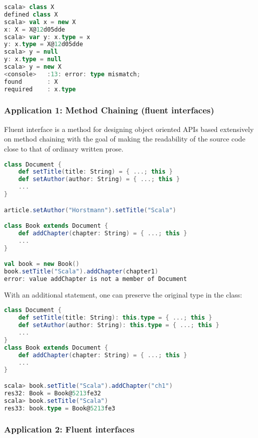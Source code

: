 \begin{lstlisting}[language=scala,mathescape=false]
scala> class X
defined class X
scala> val x = new X
x: X = X@12d05dde
scala> var y: x.type = x
y: x.type = X@12d05dde
scala> y = null
y: x.type = null
scala> y = new X
<console>   :13: error: type mismatch;
found       : X
required    : x.type
\end{lstlisting}

\clearpage
\hypertarget{application-1-method-chaining-fluent-interfaces}{%
\subsubsection{Application 1: Method Chaining (fluent
interfaces)}\label{application-1-method-chaining-fluent-interfaces}}

Fluent interface is a method for designing object oriented APIs based
extensively on method chaining with the goal of making the readability
of the source code close to that of ordinary written prose.

\begin{lstlisting}[language=scala,mathescape=false]
class Document {
    def setTitle(title: String) = { ...; this }
    def setAuthor(author: String) = { ...; this }
    ...
}

article.setAuthor("Horstmann").setTitle("Scala")

class Book extends Document {
    def addChapter(chapter: String) = { ...; this }
    ...
}

val book = new Book()
book.setTitle("Scala").addChapter(chapter1)
error: value addChapter is not a member of Document
\end{lstlisting}

With an additional statement, one can preserve the original type in the
class:

\begin{lstlisting}[language=scala,mathescape=false]
class Document {
    def setTitle(title: String): this.type = { ...; this }
    def setAuthor(author: String): this.type = { ...; this }
    ...
}
class Book extends Document {
    def addChapter(chapter: String) = { ...; this }
    ...
}

scala> book.setTitle("Scala").addChapter("ch1")
res32: Book = Book@5213fe32
scala> book.setTitle("Scala")
res33: book.type = Book@5213fe3
\end{lstlisting}

\hypertarget{application-2-fluent-interfaces}{%
\subsubsection{Application 2: Fluent
interfaces}\label{application-2-fluent-interfaces}}


